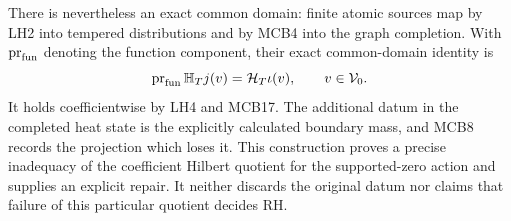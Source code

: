 There is nevertheless an exact common domain: finite atomic
sources map by LH2 into tempered distributions and by MCB4 into
the graph completion. With \(\operatorname{pr}_{\rm fun}\)
denoting the function component, their exact common-domain identity is
\[
 \operatorname{pr}_{\rm fun}\mathbb H_Tj(v)
       =\mathcal H_T\iota(v),\qquad v\in\mathcal V_0.
\]
It holds coefficientwise by LH4 and MCB17. The additional datum
in the completed heat state is the explicitly calculated
boundary mass, and MCB8 records the projection which loses it.
This construction proves a precise inadequacy of the coefficient
Hilbert quotient for the supported-zero action and supplies an
explicit repair. It neither discards the original datum nor
claims that failure of this particular quotient decides RH.
